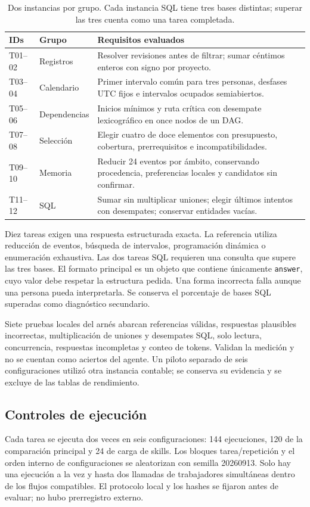 \begin{table}[htbp]
\centering\small
\begin{tabular}{@{}lp{28mm}p{101mm}@{}}
\toprule
\textbf{IDs} & \textbf{Grupo} & \textbf{Requisitos evaluados}\\
\midrule
T01--02 & Registros & Resolver revisiones antes de filtrar; sumar céntimos enteros con signo por proyecto.\\
T03--04 & Calendario & Primer intervalo común para tres personas, desfases UTC fijos e intervalos ocupados semiabiertos.\\
T05--06 & Dependencias & Inicios mínimos y ruta crítica con desempate lexicográfico en once nodos de un DAG.\\
T07--08 & Selección & Elegir cuatro de doce elementos con presupuesto, cobertura, prerrequisitos e incompatibilidades.\\
T09--10 & Memoria & Reducir 24 eventos por ámbito, conservando procedencia, preferencias locales y candidatos sin confirmar.\\
T11--12 & SQL & Sumar sin multiplicar uniones; elegir últimos intentos con desempates; conservar entidades vacías.\\
\bottomrule
\end{tabular}
\caption{Dos instancias por grupo. Cada instancia SQL tiene tres bases distintas; superar las tres cuenta como una tarea completada.}
\label{tab:tasks}
\end{table}

Diez tareas exigen una respuesta estructurada exacta. La referencia utiliza reducción de eventos, búsqueda de intervalos, programación dinámica o enumeración exhaustiva. Las dos tareas SQL requieren una consulta que supere las tres bases. El formato principal es un objeto que contiene únicamente \texttt{answer}, cuyo valor debe respetar la estructura pedida. Una forma incorrecta falla aunque una persona pueda interpretarla. Se conserva el porcentaje de bases SQL superadas como diagnóstico secundario.

Siete pruebas locales del arnés abarcan referencias válidas, respuestas plausibles incorrectas, multiplicación de uniones y desempates SQL, solo lectura, concurrencia, respuestas incompletas y conteo de tokens. Validan la medición y no se cuentan como aciertos del agente. Un piloto separado de seis configuraciones utilizó otra instancia contable; se conserva su evidencia y se excluye de las tablas de rendimiento.

\subsection{Controles de ejecución}
Cada tarea se ejecuta dos veces en seis configuraciones: 144 ejecuciones, 120 de la comparación principal y 24 de carga de skills. Los bloques tarea/repetición y el orden interno de configuraciones se aleatorizan con semilla 20260913. Solo hay una ejecución a la vez y hasta dos llamadas de trabajadores simultáneas dentro de los flujos compatibles. El protocolo local y los hashes se fijaron antes de evaluar; no hubo prerregistro externo.

